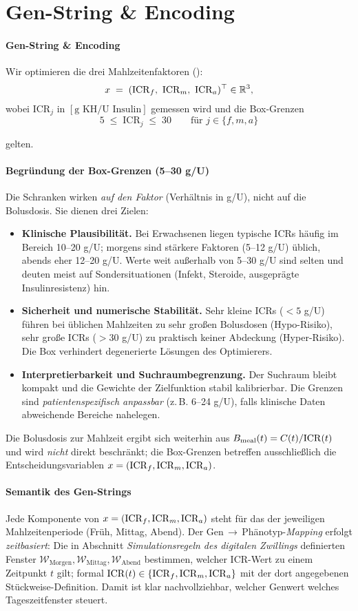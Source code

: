 \section{Gen-String \& Encoding}

\paragraph{Gen-String \& Encoding}
Wir optimieren die drei Mahlzeitenfaktoren (\IKRtxtpl):
\[
x \;=\; (\mathrm{ICR}_f,\ \mathrm{ICR}_m,\ \mathrm{ICR}_a)^\top \in \mathbb{R}^3,
\]
wobei \(\mathrm{ICR}_j\) in \([\text{g KH} / \text{U Insulin}]\) gemessen wird und die Box-Grenzen
\[
5 \;\le\; \mathrm{ICR}_j \;\le\; 30 \qquad \text{für } j \in \{f,m,a\}
\]

gelten.

\paragraph{Begründung der Box-Grenzen (5--30 g/U)}
Die Schranken wirken \emph{auf den Faktor} (Verhältnis in g/U), nicht auf die Bolusdosis. Sie dienen drei Zielen:
\begin{itemize}
  \item \textbf{Klinische Plausibilität.} Bei Erwachsenen liegen typische ICRs häufig im Bereich 10--20 g/U; morgens sind stärkere Faktoren (5--12 g/U) üblich, abends eher 12--20 g/U. Werte weit außerhalb von 5--30 g/U sind selten und deuten meist auf Sondersituationen (Infekt, Steroide, ausgeprägte Insulinresistenz) hin.
  \item \textbf{Sicherheit und numerische Stabilität.} Sehr kleine ICRs (\(<5\) g/U) führen bei üblichen Mahlzeiten zu sehr großen Bolusdosen (Hypo-Risiko), sehr große ICRs (\(>30\) g/U) zu praktisch keiner Abdeckung (Hyper-Risiko). Die Box verhindert degenerierte Lösungen des Optimierers.
  \item \textbf{Interpretierbarkeit und Suchraumbegrenzung.} Der Suchraum bleibt kompakt und die Gewichte der Zielfunktion stabil kalibrierbar. Die Grenzen sind \emph{patientenspezifisch anpassbar} (z.\,B. 6--24 g/U), falls klinische Daten abweichende Bereiche nahelegen.
\end{itemize}
Die Bolusdosis zur Mahlzeit ergibt sich weiterhin aus \(B_{\mathrm{meal}}(t)=C(t)/\mathrm{ICR}(t)\) und wird \emph{nicht} direkt beschränkt; die Box-Grenzen betreffen ausschließlich die Entscheidungsvariablen \(x=(\mathrm{ICR}_f,\mathrm{ICR}_m,\mathrm{ICR}_a)\).


\paragraph{Semantik des Gen-Strings}
Jede Komponente von \(x=(\mathrm{ICR}_f,\mathrm{ICR}_m,\mathrm{ICR}_a)\) steht für das \IKRtxt{} der jeweiligen Mahlzeitenperiode (Früh, Mittag, Abend). Der Gen\,\(\to\)\,Phänotyp-\emph{Mapping} erfolgt \emph{zeitbasiert}: Die in Abschnitt \emph{Simulationsregeln des digitalen Zwillings} definierten Fenster \(\mathcal W_{\mathrm{Morgen}},\mathcal W_{\mathrm{Mittag}},\mathcal W_{\mathrm{Abend}}\) bestimmen, welcher ICR-Wert zu einem Zeitpunkt \(t\) gilt; formal \(\mathrm{ICR}(t)\in\{\mathrm{ICR}_f,\mathrm{ICR}_m,\mathrm{ICR}_a\}\) mit der dort angegebenen Stückweise-Definition. Damit ist klar nachvollziehbar, welcher Genwert welches Tageszeitfenster steuert.

